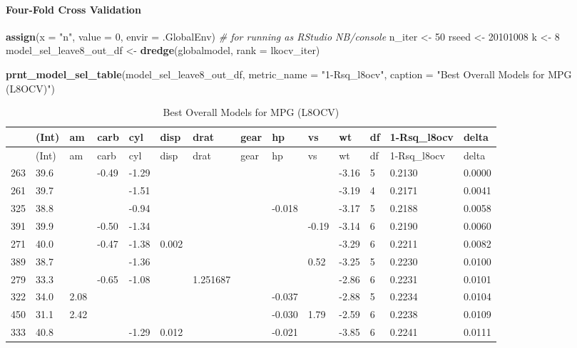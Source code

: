 \documentclass[]{article}
\newenvironment{Shaded}{\begin{snugshade}}{\end{snugshade}}
\newcommand{\KeywordTok}[1]{\textcolor[rgb]{0.13,0.29,0.53}{\textbf{{#1}}}}
\newcommand{\DataTypeTok}[1]{\textcolor[rgb]{0.13,0.29,0.53}{{#1}}}
\newcommand{\DecValTok}[1]{\textcolor[rgb]{0.00,0.00,0.81}{{#1}}}
\newcommand{\StringTok}[1]{\textcolor[rgb]{0.31,0.60,0.02}{{#1}}}
\newcommand{\CommentTok}[1]{\textcolor[rgb]{0.56,0.35,0.01}{\textit{{#1}}}}
\newcommand{\NormalTok}[1]{{#1}}
\let\oldparagraph\paragraph
\renewcommand{\paragraph}[1]{\oldparagraph{#1}\mbox{}}
\begin{document}
\paragraph{Four-Fold Cross Validation}\label{four-fold-cross-validation}

\begin{Shaded}
\begin{Highlighting}[]
\KeywordTok{assign}\NormalTok{(}\DataTypeTok{x =} \StringTok{"n"}\NormalTok{, }\DataTypeTok{value =} \DecValTok{0}\NormalTok{, }\DataTypeTok{envir =} \NormalTok{.GlobalEnv) }\CommentTok{# for running as RStudio NB/console }
\NormalTok{n_iter <-}\StringTok{ }\DecValTok{50}
\NormalTok{rseed <-}\StringTok{ }\DecValTok{20101008}
\NormalTok{k <-}\StringTok{ }\DecValTok{8}
\NormalTok{model_sel_leave8_out_df <-}\StringTok{ }\KeywordTok{dredge}\NormalTok{(globalmodel, }\DataTypeTok{rank =} \NormalTok{lkocv_iter)}
\end{Highlighting}
\end{Shaded}

\begin{Shaded}
\begin{Highlighting}[]
\KeywordTok{prnt_model_sel_table}\NormalTok{(model_sel_leave8_out_df, }\DataTypeTok{metric_name =} \StringTok{"1-Rsq_l8ocv"}\NormalTok{, }
                  \DataTypeTok{caption =} \StringTok{"Best Overall Models for MPG (L8OCV)"}\NormalTok{)}
\end{Highlighting}
\end{Shaded}

\begin{longtable}[]{@{}llllllllllllll@{}}
\caption{Best Overall Models for MPG (L8OCV)}\tabularnewline
\toprule
& (Int) & am & carb & cyl & disp & drat & gear & hp & vs & wt & df &
1-Rsq\_l8ocv & delta\tabularnewline
\midrule
\endfirsthead
\toprule
& (Int) & am & carb & cyl & disp & drat & gear & hp & vs & wt & df &
1-Rsq\_l8ocv & delta\tabularnewline
\midrule
\endhead
263 & 39.6 & & -0.49 & -1.29 & & & & & & -3.16 & 5 & 0.2130 &
0.0000\tabularnewline
261 & 39.7 & & & -1.51 & & & & & & -3.19 & 4 & 0.2171 &
0.0041\tabularnewline
325 & 38.8 & & & -0.94 & & & & -0.018 & & -3.17 & 5 & 0.2188 &
0.0058\tabularnewline
391 & 39.9 & & -0.50 & -1.34 & & & & & -0.19 & -3.14 & 6 & 0.2190 &
0.0060\tabularnewline
271 & 40.0 & & -0.47 & -1.38 & 0.002 & & & & & -3.29 & 6 & 0.2211 &
0.0082\tabularnewline
389 & 38.7 & & & -1.36 & & & & & 0.52 & -3.25 & 5 & 0.2230 &
0.0100\tabularnewline
279 & 33.3 & & -0.65 & -1.08 & & 1.251687 & & & & -2.86 & 6 & 0.2231 &
0.0101\tabularnewline
322 & 34.0 & 2.08 & & & & & & -0.037 & & -2.88 & 5 & 0.2234 &
0.0104\tabularnewline
450 & 31.1 & 2.42 & & & & & & -0.030 & 1.79 & -2.59 & 6 & 0.2238 &
0.0109\tabularnewline
333 & 40.8 & & & -1.29 & 0.012 & & & -0.021 & & -3.85 & 6 & 0.2241 &
0.0111\tabularnewline
\bottomrule
\end{longtable}
\end{document}
